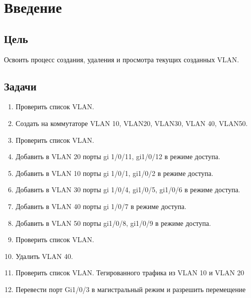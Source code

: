\chapter{Введение}

\section{Цель}  

Освоить процесс создания, удаления и просмотра текущих
созданных VLAN.

\section{Задачи}

\begin{enumerate}
    \item Проверить список VLAN.
    \item Создать на коммутаторе VLAN 10, VLAN20, VLAN30, VLAN 40, VLAN50.
    \item Проверить список VLAN.
    \item Добавить в VLAN 20 порты gi 1/0/11, gi1/0/12 в режиме доступа.
    \item Добавить в VLAN 10 порты gi 1/0/1, gi1/0/2 в режиме доступа.
    \item Добавить в VLAN 30 порты gi 1/0/4, gi1/0/5, gi1/0/6 в режиме доступа.
    \item Добавить в VLAN 40 порты gi 1/0/7 в режиме доступа.
    \item Добавить в VLAN 50 порты gi1/0/8, gi1/0/9 в режиме доступа.
    \item Проверить список VLAN.
    \item Удалить VLAN 40.
    \item Проверить список VLAN. Тегированного трафика из VLAN 10 и VLAN 20
    \item Перевести порт Gi1/0/3 в магистральный режим и разрешить перемещение
\end{enumerate}

\endinput